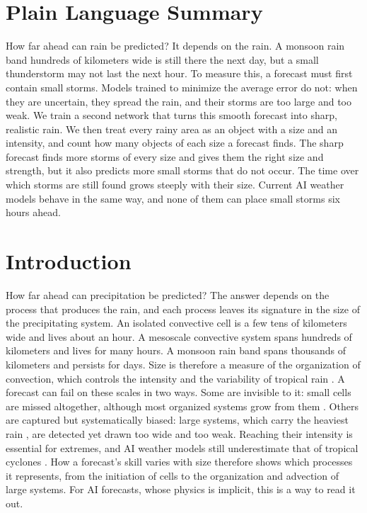 \documentclass[draft]{agujournal2019}
\begin{document}
\section*{Plain Language Summary}
How far ahead can rain be predicted? It depends on the rain. A monsoon rain
band hundreds of kilometers wide is still there the next day, but a small
thunderstorm may not last the next hour. To measure this, a forecast must
first contain small storms. Models trained to minimize the average error do
not: when they are uncertain, they spread the rain, and their storms are
too large and too weak. We train a second network that turns this smooth
forecast into sharp, realistic rain. We then treat every rainy area as an
object with a size and an intensity, and count how many objects of each
size a forecast finds. The sharp forecast finds more storms of every size
and gives them the right size and strength, but it also predicts more small
storms that do not occur. The time over which storms are still found grows
steeply with their size. Current AI weather models behave in the same way,
and none of them can place small storms six hours ahead.

\section{Introduction}

How far ahead can precipitation be predicted? The answer depends on the
process that produces the rain, and each process leaves its signature in
the size of the precipitating system. An isolated convective cell is a few
tens of kilometers wide and lives about an hour. A mesoscale convective
system spans hundreds
of kilometers and lives for many hours. A monsoon rain band spans thousands of kilometers and persists for
days. Size is therefore a measure of the organization of convection, which
controls the intensity and the variability of tropical rain
\cite{muller2022, shamekh2023}. A forecast can fail on
these scales in two ways. Some are invisible to it: small cells are missed
altogether, although most organized systems grow from them
\cite{muller2022, bony2025}. Others are captured but systematically biased: large
systems, which carry the heaviest rain \cite{roca2020, carenso2025}, are detected yet
drawn too wide and too weak. Reaching their intensity is essential for
extremes, and AI weather models still underestimate that of tropical
cyclones \cite{bi2023}. How a forecast's skill varies with size
therefore shows which processes it represents, from the initiation of
cells to the organization and advection of large systems. For AI
forecasts, whose physics is implicit, this is a way to read it out.
\end{document}
